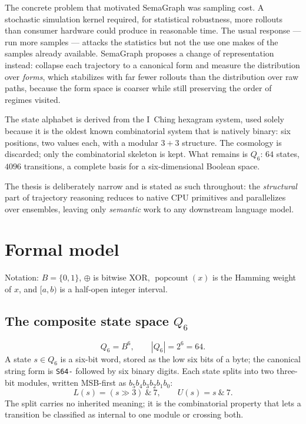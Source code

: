 \documentclass[11pt,a4paper]{article}
\begin{document}
The concrete problem that motivated SemaGraph was sampling cost. A stochastic
simulation kernel required, for statistical robustness, more rollouts than
consumer hardware could produce in reasonable time. The usual response --- run
more samples --- attacks the statistics but not the use one makes of the samples
already available. SemaGraph proposes a change of representation instead: collapse
each trajectory to a canonical form and measure the distribution over \emph{forms},
which stabilizes with far fewer rollouts than the distribution over raw paths,
because the form space is coarser while still preserving the order of regimes
visited.

The state alphabet is derived from the I~Ching hexagram system, used solely
because it is the oldest known combinatorial system that is natively binary: six
positions, two values each, with a modular $3+3$ structure. The cosmology is
discarded; only the combinatorial skeleton is kept. What remains is $Q_6$: $64$
states, $4096$ transitions, a complete basis for a six-dimensional Boolean space.

The thesis is deliberately narrow and is stated as such throughout: the
\emph{structural} part of trajectory reasoning reduces to native CPU primitives
and parallelizes over ensembles, leaving only \emph{semantic} work to any
downstream language model.

\section{Formal model}
Notation: $B=\{0,1\}$, $\oplus$ is bitwise XOR, $\operatorname{popcount}(x)$ is the
Hamming weight of $x$, and $[a,b)$ is a half-open integer interval.

\subsection{The composite state space \texorpdfstring{$Q_6$}{Q6}}
\begin{equation}
Q_6 = B^6, \qquad |Q_6| = 2^6 = 64.
\end{equation}
A state $s\in Q_6$ is a six-bit word, stored as the low six bits of a byte;
the canonical string form is \texttt{S64-} followed by six binary digits. Each
state splits into two three-bit modules, written MSB-first as $b_5b_4b_3b_2b_1b_0$:
\begin{equation}
L(s) = (s \gg 3)\ \&\ 7, \qquad U(s) = s\ \&\ 7 .
\end{equation}
The split carries no inherited meaning; it is the combinatorial property that lets
a transition be classified as internal to one module or crossing both.
\end{document}
